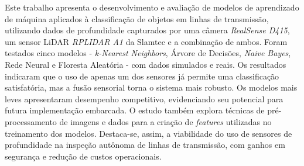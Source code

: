 
\begin{resumoutfpr}%

Este trabalho apresenta o desenvolvimento e avaliação de modelos de aprendizado de máquina aplicados à classificação de objetos em linhas de transmissão, utilizando dados de profundidade capturados por uma câmera \textit{RealSense D415}, um sensor LiDAR \textit{RPLIDAR A1} da Slamtec e a combinação de ambos. Foram testados cinco modelos - \textit{k-Nearest Neighbors}, Árvore de Decisões, \textit{Naive Bayes}, Rede Neural e Floresta Aleatória - com dados simulados e reais. Os resultados indicaram que o uso de apenas um dos sensores já permite uma classificação satisfatória, mas a fusão sensorial torna o sistema mais robusto. Os modelos mais leves apresentaram desempenho competitivo, evidenciando seu potencial para futura implementação embarcada. O estudo também explora técnicas de pré-processamento de imagens e dados para a criação de \textit{features} utilizadas no treinamento dos modelos. Destaca-se, assim, a viabilidade do uso de sensores de profundidade na inspeção autônoma de linhas de transmissão, com ganhos em segurança e redução de custos operacionais.

\end{resumoutfpr}
